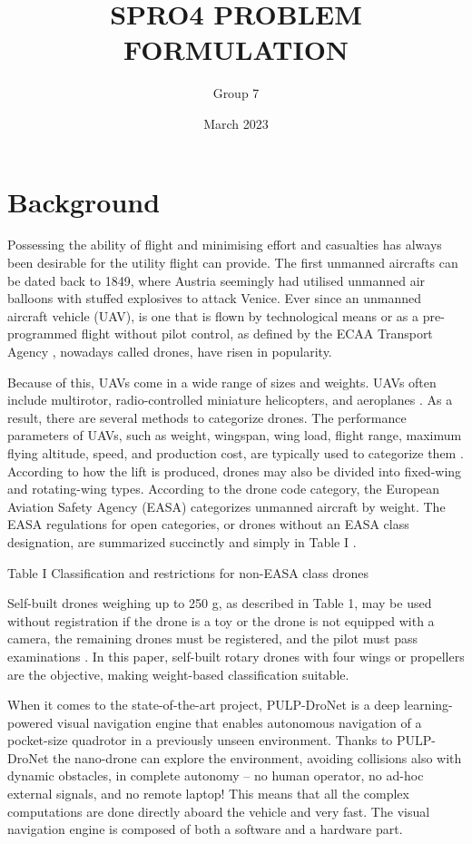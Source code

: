 \documentclass[a4paper,11pt]{article}
\title{SPRO4 PROBLEM FORMULATION}
\author{Group 7}
\date{March 2023}
\begin{document}
\maketitle
 
\section{Background}

Possessing the ability of flight and minimising effort and casualties has always been desirable for the utility flight can provide. 
The first unmanned aircrafts can be dated back to 1849, where Austria seemingly had utilised unmanned air balloons with stuffed explosives to attack Venice. \cite{Vyas2020} 
Ever since an unmanned aircraft vehicle (UAV), is one that is flown by technological means or as a pre-programmed flight without pilot control, as defined by the ECAA Transport Agency \cite{Droner}, nowadays called drones, have risen in popularity.   


Because of this, UAVs come in a wide range of sizes and weights.
UAVs often include multirotor, radio-controlled miniature helicopters, and aeroplanes \cite{Ann2012}. 
As a result, there are several methods to categorize drones. The performance parameters of UAVs, such as weight, wingspan, wing load, flight range, maximum flying altitude, speed, and production cost, are typically used to categorize them \cite{Hassanalian2017}. 
According to how the lift is produced, drones may also be divided into fixed-wing and rotating-wing types. 
According to the drone code category, the European Aviation Safety Agency (EASA) categorizes unmanned aircraft by weight. 
The EASA regulations for open categories, or drones without an EASA class designation, are summarized succinctly and simply in Table I \cite{Euasa}. 
 
\graphicspath{{classification.png}}
 Table I Classification and restrictions for non-EASA class drones \cite{Euasa} 

Self-built drones weighing up to 250 g, as described in Table 1, may be used without registration if the drone is a toy or the drone is not equipped with a camera, the remaining drones must be registered, and the pilot must pass examinations \cite{Euasa}. In this paper, self-built rotary drones with four wings or propellers are the objective, making weight-based classification suitable. 

When it comes to the state-of-the-art project, PULP-DroNet is a deep learning-powered visual navigation engine that enables autonomous navigation of a pocket-size quadrotor in a previously unseen environment. Thanks to PULP-DroNet the nano-drone can explore the environment, avoiding collisions also with dynamic obstacles, in complete autonomy -- no human operator, no ad-hoc external signals, and no remote laptop! This means that all the complex computations are done directly aboard the vehicle and very fast. The visual navigation engine is composed of both a software and a hardware part. \cite{Niculescu2021} 
\end{document}
